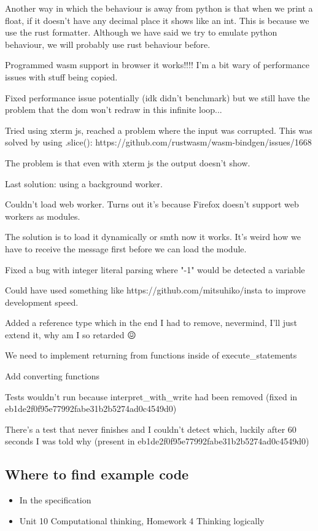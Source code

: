 \documentclass{article}
\begin{document}
Another way in which the behaviour is away from python is that when we print a
float, if it doesn't have any decimal place it shows like an int. This is
because we use the rust formatter. Although we have said we try to emulate
python behaviour, we will probably use rust behaviour before.

Programmed wasm support in browser it works!!!! I'm a bit wary of performance
issues with stuff being copied.

Fixed performance issue potentially (idk didn't benchmark) but we still have
the problem that the dom won't redraw in this infinite loop...

Tried using xterm js, reached a problem where the input was corrupted. This was
solved by using .slice(): https://github.com/rustwasm/wasm-bindgen/issues/1668

The problem is that even with xterm js the output doesn't show.

Last solution: using a background worker.

Couldn't load web worker. Turns out it's because Firefox doesn't support web
workers as modules.

The solution is to load it dynamically or smth now it works. It's weird how we
have to receive the message first before we can load the module.

Fixed a bug with integer literal parsing where "-1" would be detected a
variable

Could have used something like https://github.com/mitsuhiko/insta to improve
development speed.

Added a reference type which in the end I had to remove, nevermind, I'll just
extend it, why am I so retarded 😖

We need to implement returning from functions inside of execute\_statements

Add converting functions

Tests wouldn't run because interpret\_with\_write had been removed (fixed in
eb1de2f0f95e77992fabe31b2b5274ad0c4549d0)

There's a test that never finishes and I couldn't detect which, luckily after
60 seconds I was told why (present in eb1de2f0f95e77992fabe31b2b5274ad0c4549d0)

\subsection{Where to find example code}

\begin{itemize}
	\item In the specification
	\item Unit 10 Computational thinking, Homework 4 Thinking logically
\end{itemize}

\printbibliography[heading=bibintoc]
\end{document}
